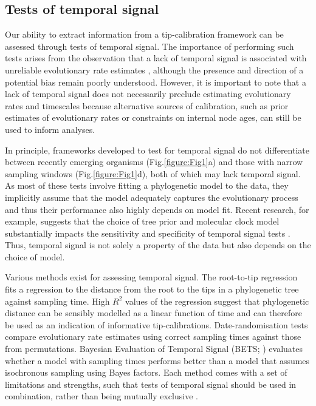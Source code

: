 \documentclass[11pt]{article}
\begin{document}
\subsection{Tests of temporal signal}
Our ability to extract information from a tip-calibration framework can be assessed through tests of temporal signal. The importance of performing such tests arises from the observation that a lack of temporal signal is associated with unreliable evolutionary rate estimates \citep{duchene2015performance, rieux2016inferences}, although the presence and direction of a potential bias remain poorly understood. However, it is important to note that a lack of temporal signal does not necessarily preclude estimating evolutionary rates and timescales because alternative sources of calibration, such as prior estimates of evolutionary rates or constraints on internal node ages, can still be used to inform analyses.

In principle, frameworks developed to test for temporal signal do not differentiate between recently emerging organisms (Fig.\ref{figure:Fig1}a) and those with narrow sampling windows (Fig.\ref{figure:Fig1}d), both of which may lack temporal signal. As most of these tests involve fitting a phylogenetic model to the data, they implicitly assume that the model adequately captures the evolutionary process and thus their performance also highly depends on model fit. Recent research, for example, suggests that the choice of tree prior and molecular clock model substantially impacts the sensitivity and specificity of temporal signal tests \citep{tay2024assessing}. Thus, temporal signal is not solely a property of the data but also depends on the choice of model.

Various methods exist for assessing temporal signal. The root-to-tip regression \citep{buonagurio1986evolution, gojobori1990molecular, drummond2003inference} fits a regression to the distance from the root to the tips in a phylogenetic tree against sampling time. High $R^2$ values of the regression suggest that phylogenetic distance can be sensibly modelled as a linear function of time and can therefore be used as an indication of informative tip-calibrations. Date-randomisation tests \citep{ramsden2009hantavirus, duchene2015performance, duchene2018inferring, trovao2015host} compare evolutionary rate estimates using correct sampling times against those from permutations. Bayesian Evaluation of Temporal Signal (BETS; \cite{duchene2020bayesian}) evaluates whether a model with sampling times performs better than a model that assumes isochronous sampling using Bayes factors. Each method comes with a set of limitations and strengths, such that tests of temporal signal should be used in combination, rather than being mutually exclusive \citep{rieux2016inferences, duchene2020bayesian}.
\end{document}
